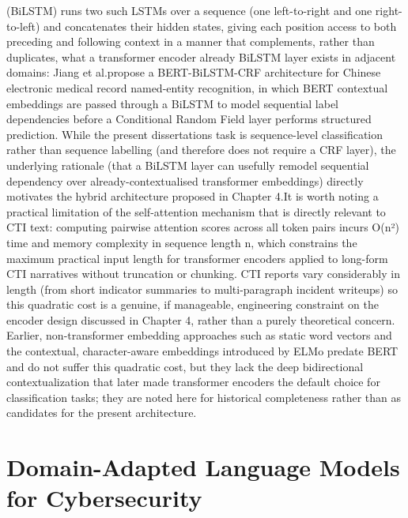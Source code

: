 \documentclass[12pt,a4paper]{report}
\begin{document}
(BiLSTM) runs two such LSTMs over a sequence (one left-to-right and one
right-to-left) and concatenates their hidden states, giving each
position access to both preceding and following context in a manner that
complements, rather than duplicates, what a transformer encoder already
\cite{cybert2021}
BiLSTM layer exists in adjacent domains: Jiang et
al.\cite{jiang2019bertbilstmcrf}propose a BERT-BiLSTM-CRF architecture
for Chinese electronic medical record named-entity recognition, in which
BERT contextual embeddings are passed through a BiLSTM to model
sequential label dependencies before a Conditional Random Field layer
performs structured prediction. While the present
dissertation\textquotesingle s task is sequence-level classification
rather than sequence labelling (and therefore does not require a CRF
layer), the underlying rationale (that a BiLSTM layer can usefully
remodel sequential dependency over already-contextualised transformer
embeddings) directly motivates the hybrid architecture proposed in
Chapter 4.It is worth noting a practical limitation of the
self-attention mechanism that is directly relevant to CTI text:
computing pairwise attention scores across all token pairs incurs O(n²)
time and memory complexity in sequence length n, which constrains the
maximum practical input length for transformer encoders applied to
long-form CTI narratives without truncation or chunking. CTI reports
vary considerably in length (from short indicator summaries to
multi-paragraph incident writeups) so this quadratic cost is a genuine,
if manageable, engineering constraint on the encoder design discussed in
Chapter 4, rather than a purely theoretical concern. Earlier,
non-transformer embedding approaches such as static word vectors and the
contextual, character-aware embeddings introduced by ELMo predate BERT
and do not suffer this quadratic cost, but they lack the deep
bidirectional contextualization that later made transformer encoders the
default choice for classification tasks; they are noted here for
historical completeness rather than as candidates for the present
architecture.

\section{Domain-Adapted Language Models for Cybersecurity}
\end{document}
